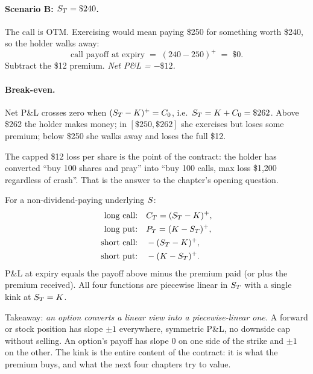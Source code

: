 \paragraph{Scenario B: $S_T = \$240$.} The call is OTM.
Exercising would mean paying \$250 for something worth \$240, so
the holder walks away:
\begin{equation*}
  \text{call payoff at expiry} \;=\; (240 - 250)^+ \;=\; \$0.
\end{equation*}
Subtract the \$12 premium. \emph{Net P\&L = $-\$12$.}

\paragraph{Break-even.} Net P\&L crosses zero when
$(S_T - K)^+ = C_0$, i.e.\
$S_T = K + C_0 = \$262$. Above \$262 the holder
makes money; in $[\$250, \$262]$ she exercises but loses some
premium; below \$250 she walks away and loses the full \$12.

The capped \$12 loss per share is the point of the contract: the
holder has converted ``buy 100 shares and pray'' into ``buy 100
calls, max loss \$1{,}200 regardless of crash''. That is the
answer to the chapter's opening question.

\begin{keyfactbox}
\label{kf:payoffs_expiry}
For a non-dividend-paying underlying $S$:
\begin{align*}
  \text{long call:}  &\quad C_T = (S_T - K)^+, \\
  \text{long put:}   &\quad P_T  = (K - S_T)^+, \\
  \text{short call:} &\quad -(S_T - K)^+, \\
  \text{short put:}  &\quad -(K - S_T)^+.
\end{align*}
P\&L at expiry equals the payoff above minus the premium paid
(or plus the premium received). All four functions are piecewise
linear in $S_T$ with a single kink at $S_T = K$.
\end{keyfactbox}

\begin{intuitionbox}
Takeaway: \emph{an option converts a linear view into a
piecewise-linear one.} A forward or stock position has slope
$\pm 1$ everywhere, symmetric P\&L, no downside cap without
selling. An option's payoff has slope $0$ on one side of the
strike and $\pm 1$ on the other. The kink is the entire content
of the contract: it is what the premium buys, and what the next
four chapters try to value.
\end{intuitionbox}

